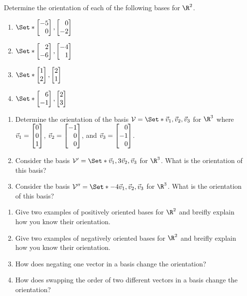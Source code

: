 \begin{exercises}
\begin{problist}
		\prob Determine the orientation of each of the following bases for $\R^2$.
		\begin{enumerate}
			\item $\Set*{\mat{-5\\0},\mat{0\\-2}}$
			\item $\Set*{\mat{2\\-6},\mat{-4\\1}}$
			\item $\Set*{\mat{1\\2},\mat{2\\1}}$
			\item $\Set*{\mat{6\\-1},\mat{2\\3}}$
		\end{enumerate}

		\prob
		\begin{enumerate}
		\item Determine the orientation of the basis
		$\mathcal V = \Set*{\vec v_1, \vec v_2, \vec v_3}$ for $\R^3$ where
		$\vec v_1 = \mat{0\\0\\1}$, $\vec v_2 = \mat{-1\\0\\0}$, and
		$\vec v_3 = \mat{0\\-1\\0}$.
		\item Consider the basis $\mathcal V' = \Set*{\vec v_1, 3\vec v_2, \vec v_3}$ for $\R^3$.
		What is the orientation of this basis?
		\item Consider the basis $\mathcal V'' = \Set*{-4\vec v_1, \vec v_2, \vec v_3}$ for $\R^3$.
		What is the orientation of this basis?
		\end{enumerate}

		\prob
		\begin{enumerate}
			\item Give two examples of positively oriented bases for $\R^2$
			and breifly explain how you know their orientation.
			\item Give two examples of negatively oriented bases for $\R^2$
			and breifly explain how you know their orientation.
			\item How does negating one vector in a basis change the orientation?
			\item How does swapping the order of two different vectors in a basis
			change the orientation?
		\end{enumerate}

	\end{problist}
\end{exercises}
